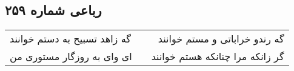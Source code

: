 \begin{center}
\section*{رباعی شماره ۲۵۹}
\label{sec:sh259}
\begin{longtable}{l p{0.5cm} r}
گه زاهد تسبیح به دستم خوانند
&&
گه رندو خراباتی و مستم خوانند
\\
ای وای به روزگار مستوری من
&&
گر زانکه مرا چنانکه هستم خوانند
\\
\end{longtable}
\end{center}
